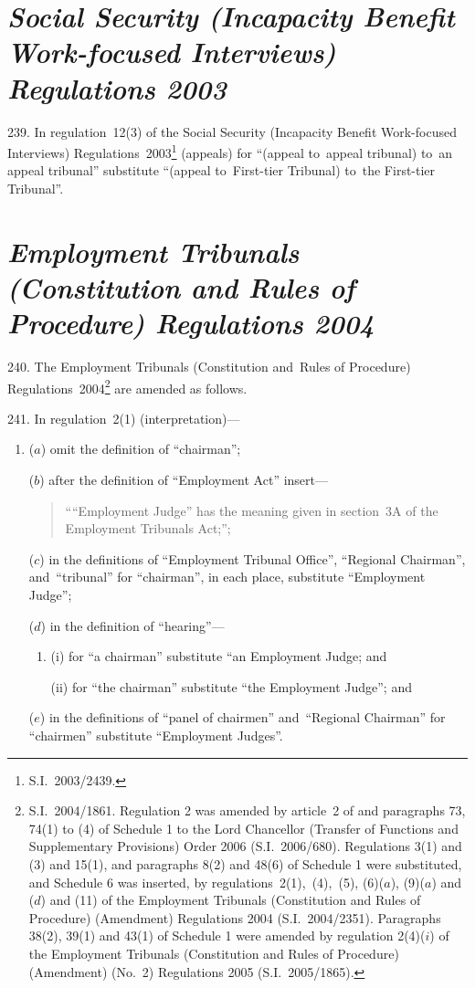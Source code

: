 \documentclass[12pt,a4paper]{article}
\begin{document}
\section*{\itshape\sloppy Social Security (Incapacity Benefit Work-\hspace{0pt}focused Interviews) Regulations 2003}

239.  In regulation~12(3) of the Social Security (Incapacity Benefit Work-focused Interviews) Regulations~2003\footnote{S.I.~2003/2439.} (appeals) for “(appeal to~appeal tribunal) to~an appeal tribunal” substitute “(appeal to~First-tier Tribunal) to~the First-tier Tribunal”.

\vfill

\section*{\itshape\sloppy{} Employment Tribunals (Constitution and Rules of Procedure) Regulations 2004}

240.  The Employment Tribunals (Constitution and~Rules of Procedure) Regulations~2004\footnote{S.I.~2004/1861. Regulation 2 was amended by article~2 of and paragraphs 73, 74(1) to (4) of Schedule 1 to the Lord Chancellor (Transfer of Functions and Supplementary Provisions) Order 2006 (S.I.~2006/680). Regulations 3(1) and (3) and 15(1), and paragraphs 8(2) and 48(6) of Schedule 1 were substituted, and Schedule 6 was inserted, by regulations~2(1),~(4),~(5), (6)($a$), (9)($a$) and ($d$) and (11) of the Employment Tribunals (Constitution and Rules of Procedure) (Amendment) Regulations 2004 (S.I.~2004/2351). Paragraphs 38(2), 39(1) and 43(1) of Schedule 1 were amended by regulation 2(4)($i$) of the Employment Tribunals (Constitution and Rules of Procedure) (Amendment) (No.~2) Regulations 2005 (S.I.~2005/1865).} are amended as follows.

\medskip

241.  In regulation~2(1) (interpretation)—
\begin{enumerate}\item[]
($a$) omit the definition of “chairman”;

($b$) after the definition of “Employment Act” insert—
\begin{quotation}
““Employment Judge” has the meaning given in section~3A of the Employment Tribunals Act;”;
\end{quotation}

($c$) in the definitions of “Employment Tribunal Office”, “Regional Chairman”, and~“tribunal” for “chairman”, in each place, substitute “Employment Judge”;

($d$) in the definition of “hearing”—
\begin{enumerate}\item[]
(i) for “a chairman” substitute “an Employment Judge; and

(ii) for “the chairman” substitute “the Employment Judge”; and
\end{enumerate}

($e$) in the definitions of “panel of chairmen” and~“Regional Chairman” for “chairmen” substitute “Employment Judges”.
\end{enumerate}
\end{document}
